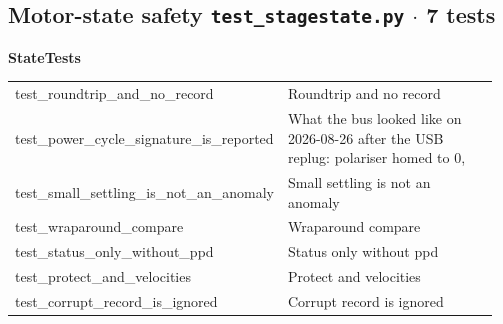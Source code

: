 \subsection{Motor-state safety \hfill \normalfont\small\color{soft2}\texttt{test\_stagestate.py} $\cdot$ 7 tests}
\par\smallskip \textbf{StateTests}\par\nopagebreak\smallskip
\begin{longtable}{@{}>{\ttfamily\scriptsize\raggedright\arraybackslash}p{0.40\linewidth} >{\footnotesize\raggedright\arraybackslash}p{0.555\linewidth}@{}}
test\_\allowbreak{}roundtrip\_\allowbreak{}and\_\allowbreak{}no\_\allowbreak{}record & Roundtrip and no record \\
test\_\allowbreak{}power\_\allowbreak{}cycle\_\allowbreak{}signature\_\allowbreak{}is\_\allowbreak{}reported & What the bus looked like on 2026-08-26 after the USB replug: polariser homed to 0, \\
test\_\allowbreak{}small\_\allowbreak{}settling\_\allowbreak{}is\_\allowbreak{}not\_\allowbreak{}an\_\allowbreak{}anomaly & Small settling is not an anomaly \\
test\_\allowbreak{}wraparound\_\allowbreak{}compare & Wraparound compare \\
test\_\allowbreak{}status\_\allowbreak{}only\_\allowbreak{}without\_\allowbreak{}ppd & Status only without ppd \\
test\_\allowbreak{}protect\_\allowbreak{}and\_\allowbreak{}velocities & Protect and velocities \\
test\_\allowbreak{}corrupt\_\allowbreak{}record\_\allowbreak{}is\_\allowbreak{}ignored & Corrupt record is ignored \\
\end{longtable}
